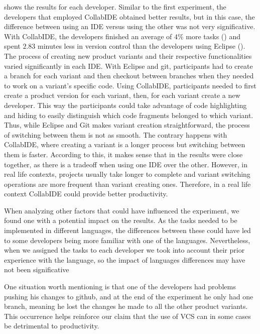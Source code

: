  shows the results for each developer. Similar to the first experiment, 
the developers that employed CollabIDE obtained better results, but in this case, the difference 
between using an IDE versus using the other was not very significative. With CollabIDE, the 
developers finished an average of $4\%$ more tasks () and spent 
$2.83$ minutes less in version control than the developers using Eclipse 
(). The process of creating new product variants and their 
respective functionalities varied significantly in each IDE. With Eclipse and git, participants had to 
create a branch for each variant and then checkout between branches when they needed to work on a 
variant’s specific code. Using CollabIDE, participants needed to first create a product version for each 
variant, then, for each variant create a new developer. This way the participants could take advantage 
of code highlighting and hiding to easily distinguish which code fragments belonged to which variant. 
Thus, while Eclipse and Git makes variant creation straightforward, the process of switching between 
them is not as smooth. The contrary happens with CollabIDE, where creating a variant is a longer 
process but switching between them is faster. According to this, it makes sense that in the results 
were close together, as there is a tradeoff when using one IDE over the other. However, in real life 
contexts, projects usually take longer to complete and variant switching operations are more frequent 
than variant creating ones. Therefore, in a real life context CollabIDE could provide better productivity.

When analyzing other factors that could have influenced the experiment, we found one with a potential 
impact on the results. As the tasks needed to be implemented in different languages, the differences 
between these could have led to some developers being more familiar with one of the languages. 
Nevertheless, when we assigned the tasks to each developer we took into account their prior 
experience with the language, so the impact of languages differences may have not been significative

One situation worth mentioning is that one of the developers had problems pushing his changes to 
github, and at the end of the experiment he only had one branch, meaning he lost the changes he 
made to all the other product variants. This occurrence helps reinforce our claim that the use of 
\ac{VCS} can in some cases be detrimental to productivity.

